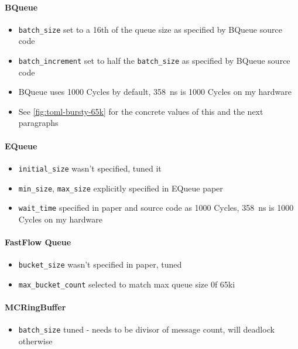 \paragraph{BQueue}
\begin{itemize}
    \item \texttt{batch\_size} set to a 16th of the queue size as specified by BQueue source code
    \item \texttt{batch\_increment} set to half the \texttt{batch\_size} as specified by BQueue source code
    \item BQueue uses 1000 Cycles by default, \SI{358}{\nano\second} is 1000 Cycles on my hardware
    \item See \autoref{fig:toml-bursty-65k} for the concrete values of this and the next paragraphs
\end{itemize}

\paragraph{EQueue}
\begin{itemize}
    \item \texttt{initial\_size} wasn't specified, tuned it
    \item \texttt{min\_size}, \texttt{max\_size} explicitly specified in EQueue paper
    \item \texttt{wait\_time} specified in paper and source code as 1000 Cycles, \SI{358}{\nano\second} is
        1000 Cycles on my hardware
\end{itemize}

\paragraph{FastFlow Queue}
\begin{itemize}
    \item \texttt{bucket\_size} wasn't specified in paper, tuned
    \item \texttt{max\_bucket\_count} selected to match max queue size 0f 65ki
\end{itemize}

\paragraph{MCRingBuffer}
\begin{itemize}
    \item \texttt{batch\_size} tuned - needs to be divisor of message count, will deadlock otherwise
\end{itemize}

